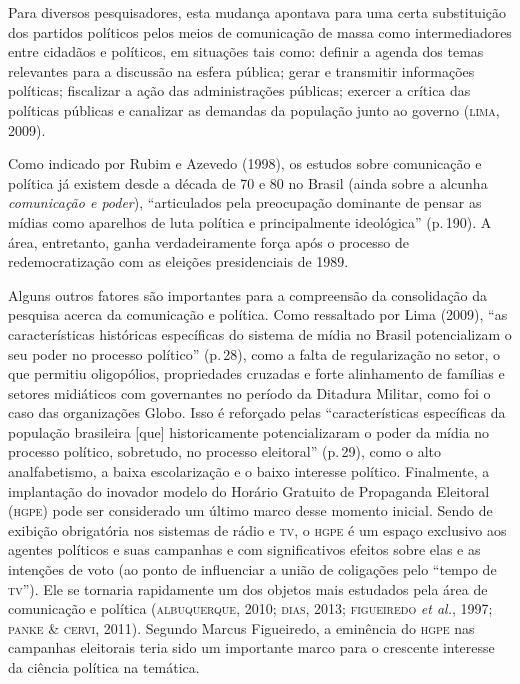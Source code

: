 Para diversos pesquisadores, esta mudança apontava para uma certa
substituição dos partidos políticos pelos meios de comunicação de massa
como intermediadores entre cidadãos e políticos, em situações tais como:
definir a agenda dos temas relevantes para a discussão na esfera
pública; gerar e transmitir informações políticas; fiscalizar a
ação das administrações públicas; exercer a crítica das políticas
públicas e canalizar as demandas da população junto ao governo (\textsc{lima},
2009).

Como indicado por Rubim e Azevedo (1998), os estudos sobre comunicação e
política já existem desde a década de 70 e 80 no Brasil (ainda sobre a
alcunha \textit{comunicação e poder}), ``articulados pela preocupação
dominante de pensar as mídias como aparelhos de luta política e
principalmente ideológica'' (p.\,190). A área, entretanto, ganha
verdadeiramente força após o processo de redemocratização com as
eleições presidenciais de 1989.

Alguns outros fatores são importantes para a compreensão da consolidação
da pesquisa acerca da comunicação e política. Como ressaltado por Lima
(2009), ``as características históricas específicas do sistema de mídia
no Brasil potencializam o seu poder no processo político'' (p.\,28), como
a falta de regularização no setor, o que permitiu oligopólios,
propriedades cruzadas e forte alinhamento de famílias e setores
midiáticos com governantes no período da Ditadura Militar, como foi o
caso das organizações Globo. Isso é reforçado pelas ``características
específicas da população brasileira {[}que{]} historicamente
potencializaram o poder da mídia no processo político, sobretudo, no
processo eleitoral'' (p.\,29), como o alto analfabetismo, a baixa
escolarização e o baixo interesse político. Finalmente, a implantação do
inovador modelo do Horário Gratuito de Propaganda Eleitoral (\textsc{hgpe}) pode
ser considerado um último marco desse momento inicial. Sendo de exibição
obrigatória nos sistemas de rádio e \textsc{tv}, o \textsc{hgpe} é um espaço exclusivo aos
agentes políticos e suas campanhas e com significativos efeitos sobre
elas e as intenções de voto (ao ponto de influenciar a união de
coligações pelo ``tempo de \textsc{tv}''). Ele se tornaria rapidamente um dos
objetos mais estudados pela área de comunicação e política (\textsc{albuquerque},
2010; \textsc{dias}, 2013; \textsc{figueiredo} \textit{et al.}, 1997; \textsc{panke \& cervi}, 2011).
Segundo Marcus Figueiredo, a eminência do \textsc{hgpe} nas campanhas eleitorais
teria sido um importante marco para o crescente interesse da ciência
política na temática.


